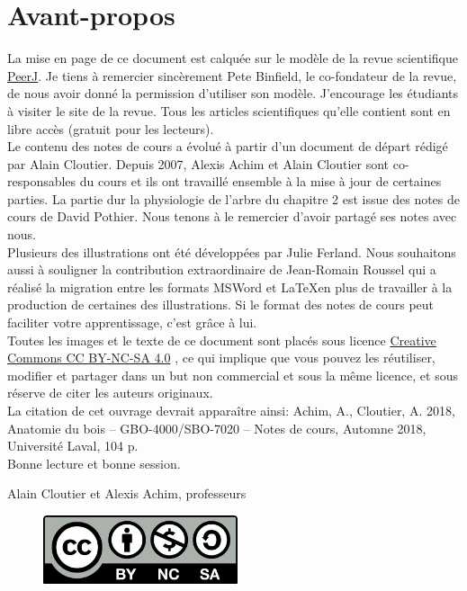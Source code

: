 \chapter*{Avant-propos}

La mise en page de ce document est calquée sur le modèle de la revue scientifique \href{https://peerj.com/}{PeerJ}. Je tiens à remercier sincèrement Pete Binfield, le co-fondateur de la revue, de nous avoir donné la permission d'utiliser son modèle. J'encourage les étudiants à visiter le site de la revue. Tous les articles scientifiques qu'elle contient sont en libre accès (gratuit pour les lecteurs).\\

Le contenu des notes de cours a évolué à partir d'un document de départ rédigé par Alain Cloutier. Depuis 2007, Alexis Achim et Alain Cloutier sont co-responsables du cours et ils ont travaillé ensemble à la mise à jour de certaines parties. La partie dur la physiologie de l'arbre du chapitre 2 est issue des notes de cours de David Pothier. Nous tenons à le remercier d'avoir partagé ses notes avec nous.\\

Plusieurs des illustrations ont été développées par Julie Ferland. Nous souhaitons aussi à souligner la contribution extraordinaire de Jean-Romain Roussel qui a réalisé la migration entre les formats MSWord et \LaTeX en plus de travailler à la production de certaines des illustrations. Si le format des notes de cours peut faciliter votre apprentissage, c'est grâce à lui.\\

Toutes les images et le texte de ce document sont placés sous licence \href{https://creativecommons.org/licenses/by-nc-sa/4.0/}{Creative Commons CC BY-NC-SA 4.0}
, ce qui implique que vous pouvez les réutiliser, modifier et partager dans un but non commercial et sous la même licence, et sous réserve de citer les auteurs originaux.\\

La citation de cet ouvrage devrait apparaître ainsi: Achim, A., Cloutier, A. 2018, Anatomie du bois -- GBO-4000/SBO-7020 -- Notes de cours, Automne 2018, Université Laval, 104 p.\\

 
 Bonne lecture et bonne session.\\
 
 \begin{flushright}
 	Alain Cloutier et Alexis Achim, professeurs
 \end{flushright}

\begin{figure}[ht]
	\centering
	\includegraphics[height=2cm]{img/CC_licence}
\end{figure}

